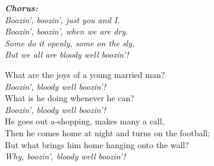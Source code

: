 \documentclass[twoside,16pt,openany,letterpaper]{memoir}%
\newcommand\customchorus[2]{
  \quad\Large\textit{\textbf{#1}}\\\normalsize\textit{#2}
}
\newcommand\chorus[1]{
  \customchorus{Chorus:}{#1}
}
\newcommand\chline[1]{
  \quad\textit{#1}
}
\begin{document}
\chorus{
  Boozin', boozin', just you and I.\\
  Boozin', boozin', when we are dry.\\
  Some do it openly, some on the sly,\\
  But we all are bloody well boozin'!\\
}

What are the joys of a young married man?\\
\chline{Boozin', bloody well boozin'!}\\
What is he doing whenever he can?\\
\chline{Boozin', bloody well boozin'!}\\
He goes out a-shopping, makes many a call,\\
Then he comes home at night and turns on the football;\\
But what brings him home hanging onto the wall?\\
\chline{Why, boozin', bloody well boozin'!}\\
\end{document}
